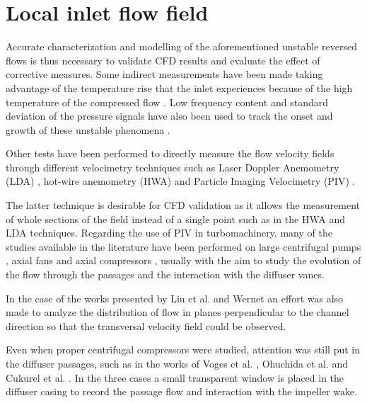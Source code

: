 \section{Local inlet flow field}
\label{sec:liter_local_flow}

Accurate characterization and modelling of the aforementioned unstable reversed flows is thus necessary to validate CFD results and evaluate the effect of corrective measures. Some indirect measurements have been made taking advantage of the temperature rise that the inlet experiences because of the high temperature of the compressed flow \cite{andersen2009surge,figurella2014noise}. Low frequency content and standard deviation of the pressure signals have also been used to track the onset and growth of these unstable phenomena \cite{liu2013methods}.

Other tests have been performed to directly measure the flow velocity fields through different velocimetry techniques such as Laser Doppler Anemometry (LDA) \cite{pedersen2003flow}, hot-wire anemometry (HWA) \cite{oro2009forced,kalpakli2015combined} and Particle Imaging Velocimetry (PIV) \cite{wernet2000development,liu2006application,pedersen2003flow}.

The latter technique is desirable for CFD validation as it allows the measurement of whole sections of the field instead of a single point such as in the HWA and LDA techniques. Regarding the use of PIV in turbomachinery, many of the studies available in the literature have been performed on large centrifugal pumps \cite{pedersen2003flow,dazin2011high,wu2011piv}, axial fans \cite{fike2014visualisation,oro2009forced} and axial compressors \cite{liu2006application,wernet2000development,wernet2000application,wernet2001investigation}, usually with the aim to study the evolution of the flow through the passages and the interaction with the diffuser vanes. 

In the case of the works presented by Liu et al. \cite{liu2006application} and Wernet \cite{wernet2000development,wernet2000application} an effort was also made to analyze the distribution of flow in planes perpendicular to the channel direction so that the transversal velocity field could be observed.

Even when proper centrifugal compressors were studied, attention was still put in the diffuser passages, such as in the works of Voges et al. \cite{voges2007application}, Ohuchida et al. \cite{ohuchida2013internal} and Cukurel et al. \cite{cukurel2010particle}. In the three cases a small transparent window is placed in the diffuser casing to record the passage flow and interaction with the impeller wake.


